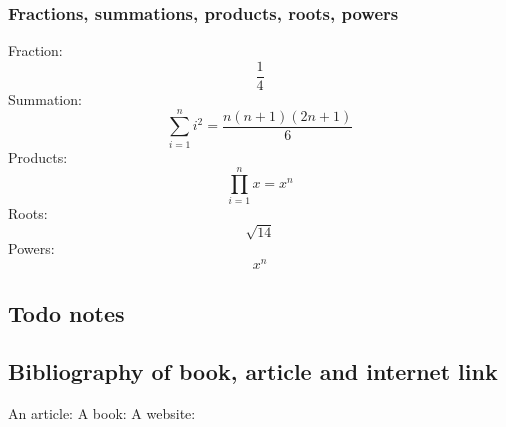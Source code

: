\documentclass{article}
\begin{document}
        \subsubsection{Fractions, summations, products, roots, powers}
            Fraction: 
            \[\frac{1}{4}\]
            Summation: 
            \[\sum\limits_{i=1}^n i^2 = \frac{n(n+1)(2n+1)}{6}\]
            Products:
            \[\prod\limits_{i=1}^n x = x^n\]
            Roots:
            \[ \sqrt{14} \]
            Powers:
            \[ x^n \]
    
    \subsection{Todo notes}
    
    \newpage
    \subsection{Bibliography of book, article and internet link}
        An article: \cite{Clear} 
        A book: \cite{latexcompanion}
        A website: \cite{knuthwebsite} 

    \printbibliography
         
    
\end{document}
